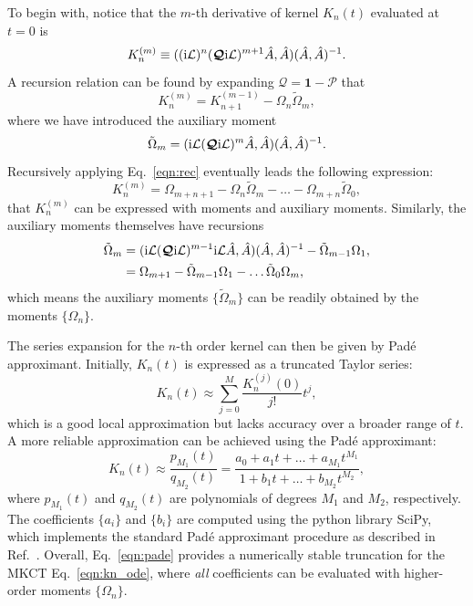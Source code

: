\documentclass[preprint,aip,jcp]{revtex4-2}
\newcommand{\im}{\textup{i}}
\newcommand{\Lv}{\mathcal{L}}
\newcommand{\Proj}{\bm{\mathcal{P}}}
\newcommand{\Qroj}{\bm{\mathcal{Q}}}
\begin{document}
To begin with, notice that the $m$-th derivative of kernel $K_n(t)$ evaluated at $t=0$ is 
\begin{equation}\label{eqn:deriv_Kn}
    K_n^{(m)} \equiv ((\im\Lv)^n (\Qroj \im \Lv)^{m+1} \hat{A}, \hat{A}) (\hat{A}, \hat{A})^{-1}.
\end{equation}
A recursion relation can be found by expanding $\Qroj = \bm{1} - \Proj$ that
\begin{equation}\label{eqn:rec}
    K_n^{(m)} = K_{n+1}^{(m-1)} - \Omega_n \tilde{\Omega}_m,
\end{equation}
where we have introduced the auxiliary moment 
\begin{equation}
    \tilde{\Omega}_m = (\im\Lv (\Qroj \im \Lv)^{m} \hat{A}, \hat{A}) (\hat{A}, \hat{A})^{-1}.
\end{equation}
Recursively applying Eq.~\ref{eqn:rec} eventually leads the following expression: 
\begin{equation}
    K_{n}^{(m)} = \Omega_{m+n+1} - \Omega_{n} \tilde{\Omega}_{m} - \dots - \Omega_{m+n} \tilde{\Omega}_{0}, 
\end{equation}
that $K_{n}^{(m)}$ can be expressed with moments and auxiliary moments. Similarly, the auxiliary moments themselves have recursions
\begin{equation}    
\begin{aligned}
    \tilde{\Omega}_m &= (\im\Lv (\Qroj \im \Lv)^{m-1} \im \Lv \hat{A}, \hat{A}) (\hat{A}, \hat{A})^{-1} - \tilde{\Omega}_{m-1} \Omega_1, \\
    &= \Omega_{m+1} - \tilde{\Omega}_{m-1} \Omega_1 - \dots \tilde{\Omega}_0 \Omega_{m}, 
\end{aligned}
\end{equation}
which means the auxiliary moments $\{\tilde{\Omega}_m\}$ can be readily obtained by the moments $\{\Omega_n\}$. 

The series expansion for the $n$-th order kernel can then be given by Pad\'{e} approximant. Initially, $K_n(t)$ is expressed as a truncated Taylor series:
\begin{equation}
    K_n(t) \approx \sum_{j=0}^{M} \frac{K_n^{(j)}(0)}{j!} t^j,
\end{equation}
which is a good local approximation but lacks accuracy over a broader range of $t$. A more reliable approximation can be achieved using the Pad\'{e} approximant: 
\begin{equation}\label{eqn:pade}
    K_n(t) \approx \frac{p_{M_1}(t)}{q_{M_2}(t)} = \frac{a_0 + a_1 t + \dots + a_{M_1} t^{M_1}}{1 + b_1 t + \dots + b_{M_2} t^{M_2}},
\end{equation}
where $ p_{M_1}(t)$ and $q_{M_2}(t)$ are polynomials of degrees $M_1$ and $M_2$, respectively. The coefficients $\{a_i\}$ and $\{b_i\}$ are computed using the python library SciPy, which implements the standard Pad\'{e} approximant procedure as described in Ref.~\cite{Baker1996pade}. Overall, Eq.~\ref{eqn:pade} provides a numerically stable truncation for the MKCT Eq.~\ref{eqn:kn_ode}, where \emph{all} coefficients can be evaluated with higher-order moments $\{ \Omega_n \}$.
\end{document}
